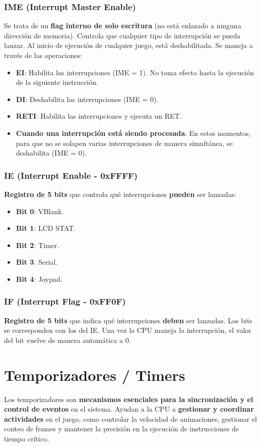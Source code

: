 \subsubsection{IME (Interrupt Master Enable)}
Se trata de un \textbf{flag interno de solo escritura} (no está enlazado a ninguna dirección de memoria). Controla que cualquier tipo de interrupción se pueda lanzar. Al inicio de ejecución de cualquier juego, está deshabilitada. Se maneja a través de las operaciones:
\begin{itemize}
    \item \textbf{EI}: Habilita las interrupciones (IME = 1). No toma efecto hasta la ejecución de la siguiente instrucción.
    \item \textbf{DI}: Deshabilita las interrupciones (IME = 0).
    \item \textbf{RETI}: Habilita las interrupciones y ejecuta un RET.
    \item \textbf{Cuando una interrupción está siendo procesada}: En estos momentos, para que no se solapen varias interrupciones de manera simultánea, se deshabilita (IME = 0).
\end{itemize}

\subsubsection{IE (Interrupt Enable - 0xFFFF)}
\textbf{Registro de 5 bits} que controla qué interrupciones \textbf{pueden} ser lanzadas:
\begin{itemize}
    \item \textbf{Bit 0}: VBlank.
    \item \textbf{Bit 1}: LCD STAT.
    \item \textbf{Bit 2}: Timer.
    \item \textbf{Bit 3}: Serial.
    \item \textbf{Bit 4}: Joypad.
\end{itemize}

\subsubsection{IF (Interrupt Flag - 0xFF0F)}
\textbf{Registro de 5 bits} que indica qué interrupciones \textbf{deben} ser lanzadas. Los bits se corresponden con los del IE.
Una vez la CPU maneja la interrupción, el valor del bit vuelve de manera automática a 0.

\section{Temporizadores / Timers}
\label{history_timer}
Los temporizadores son \textbf{mecanismos esenciales para la sincronización y el control de eventos} en el sistema. Ayudan a la CPU a \textbf{gestionar y coordinar actividades} en el juego, como controlar la velocidad de animaciones, gestionar el conteo de frames y mantener la precisión en la ejecución de instrucciones de tiempo crítico.

